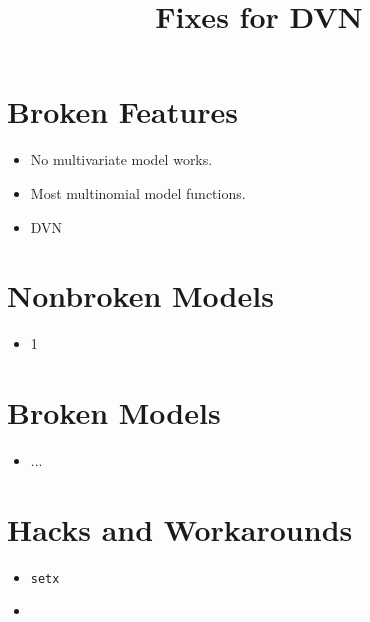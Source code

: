 \documentclass{article}
\title{Fixes for DVN}
\begin{document}
\maketitle

\section{Broken Features}

\begin{itemize}
  \item No multivariate model works.
  \item Most multinomial model functions.
  \item DVN 
\end{itemize}

\section{Nonbroken Models}
\begin{itemize}
  \item 1
\end{itemize}

\section{Broken Models}
\begin{itemize}
  \item ...
\end{itemize}

\section{Hacks and Workarounds}
\begin{itemize}
  \item {\tt setx}
  \item 
\end{itemize}
\end{document}
